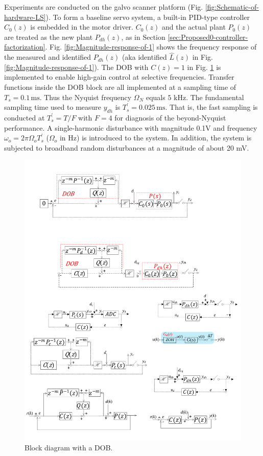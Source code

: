 \documentclass [11pt, proquest] {uwthesis}[2020/02/24]
\begin{document}
Experiments are conducted on the galvo scanner platform (Fig. \ref{fig:Schematic-of-hardware-LS}). To form a baseline servo system, a built-in PID-type controller $C_{0}(z)$
is embedded in the motor driver. $C_{0}(z)$ and the actual plant
$P_{0}(z)$ are treated as the new plant $P_{dh}(z)$, as in Section \ref{sec:Proposed0-controller-factorization}.
Fig. \ref{fig:Magnitude-response-of-1} shows the frequency response of the measured
and identified $P_{dh}(z)$ (aka identified $\hat{L}(z)$ in Fig. \ref{fig:Magnitude-response-of-1}). The DOB \cite{XuChen_TCST2012} with
$C(z)=1$ in Fig. \ref{fig:Block-diagram-with} is implemented to enable high-gain control at selective
frequencies. Transfer functions inside the DOB block are all implemented
at a sampling time of $T_{s}=0.1\,\text{ms}$. Thus the Nyquist frequency
$\Omega_{N}$ equals $5\text{ kHz}$. The fundamental sampling time
used to measure $y_{dh}$ is $T_{s}^{'}=0.025\,\text{ms}$. That is,
the fast sampling is conducted at $T_{s}^{'}=T/F$ with $F=4$ for
diagnosis of the beyond-Nyquist performance. A single-harmonic disturbance
with magnitude 0.1V and frequency $\omega_{o}=2\pi\Omega_{o}T_{s}^{'}$
($\Omega_{o}$ in Hz) is introduced to the system. In addition, the
system is subjected to broadband random disturbances at a magnitude
of about 20 mV.
\begin{figure}[!ht]
\begin{centering}
\includegraphics[width=12cm]{Spectral-analysis/FIG15.pdf}
\par\end{centering}
\caption{\label{fig:Block-diagram-with}Block diagram with a DOB.}
\end{figure}
\end{document}
